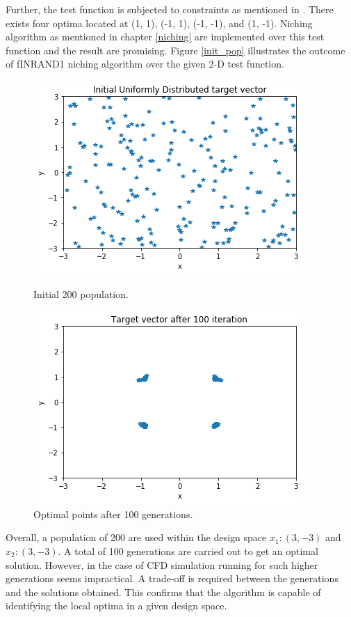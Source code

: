 Further, the test function is subjected to constraints as mentioned in \cite{Poole3}. There exists four optima located at (1, 1), (-1, 1), (-1, -1), and (1, -1). Niching algorithm as mentioned in chapter \ref{niching} are implemented over this test function and the result are promising. Figure \ref{init_pop} illustrates the outcome of fINRAND1 niching algorithm over the given 2-D test function. 
\begin{figure}[!htbp]
\parbox{0.47\linewidth}
    {
    \centering
    \includegraphics[scale = 0.5]{figures/initial_pop.png}
    \caption{Initial 200 population.}
    \label{init_pop}
    }
\parbox{0.47\linewidth}
    {
    \centering
    \includegraphics[scale = 0.5]{figures/final_target.png}
    \caption{Optimal points after 100 generations.}
    \label{target_points}
    }
\end{figure}

Overall, a population of 200 are used within the design space $x_1:(3, -3)$ and $x_2:(3, -3)$. A total of 100 generations are carried out to get an optimal solution. However, in the case of CFD simulation running for such higher generations seems impractical. A trade-off is required between the generations and the solutions obtained. This confirms that the algorithm is capable of identifying the local optima in a given design space.

